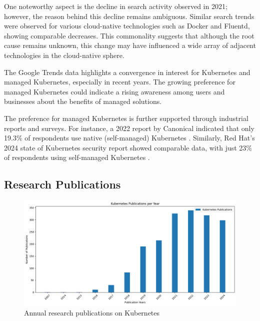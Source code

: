 One noteworthy aspect is the decline in search activity observed in 2021; however, the reason behind this decline remains ambiguous. Similar search trends were observed for various cloud-native technologies such as Docker and Fluentd, showing comparable decreases. This commonality suggests that although the root cause remains unknown, this change may have influenced a wide array of adjacent technologies in the cloud-native sphere.

The Google Trends data highlights a convergence in interest for Kubernetes and managed Kubernetes, especially in recent years. The growing preference for managed Kubernetes could indicate a rising awareness among users and businesses about the benefits of managed solutions.

The preference for managed Kubernetes is further supported through industrial reports and surveys. For instance, a 2022 report by Canonical indicated that only 19.3\% of respondents use native (self-managed) Kubernetes \cite{canonicalKubernetesCloudNative2022}. Similarly, Red Hat's 2024 state of Kubernetes security report showed comparable data, with just 23\% of respondents using self-managed Kubernetes \cite{redhatinc.StateKubernetesSecurity2024}.

\subsection{Research Publications}\label{subsec:research-publications}

\FloatBarrier

\begin{figure}
    \centering
    \includegraphics[width=1\linewidth]{resources/publications-plot-k8s.png}
    \caption{Annual research publications on Kubernetes}
    \label{fig:research-publications-kubernetes-and-managed-kubernetes}
\end{figure}


